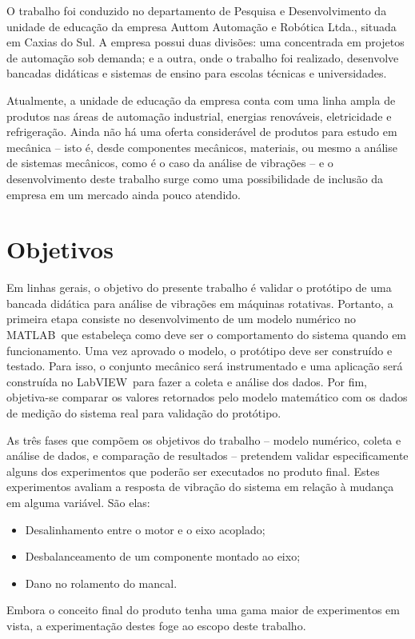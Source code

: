 \documentclass[12pt,openright,twoside,a4paper,
	chapter=TITLE,section=TITLE,
	english,brazil]{abntex2}
\begin{document}
	O trabalho foi conduzido no departamento de Pesquisa e Desenvolvimento da unidade de educação da empresa Auttom Automação e Robótica Ltda., situada em Caxias do Sul. A empresa possui duas divisões: uma concentrada em projetos de automação sob demanda; e a outra, onde o trabalho foi realizado, desenvolve bancadas didáticas e sistemas de ensino para escolas técnicas e universidades.
	
	Atualmente, a unidade de educação da empresa conta com uma linha ampla de produtos nas áreas de automação industrial, energias renováveis, eletricidade e refrigeração. Ainda não há uma oferta considerável de produtos para estudo em mecânica -- isto é, desde componentes mecânicos, materiais, ou mesmo a análise de sistemas mecânicos, como é o caso da análise de vibrações -- e o desenvolvimento deste trabalho surge como uma possibilidade de inclusão da empresa em um mercado ainda pouco atendido.
	
	\section{Objetivos}
	
	Em linhas gerais, o objetivo do presente trabalho é validar o protótipo de uma bancada didática para análise de vibrações em máquinas rotativas. Portanto, a primeira etapa consiste no desenvolvimento de um modelo numérico no MATLAB\textsuperscript\textregistered\ que estabeleça como deve ser o comportamento do sistema quando em funcionamento. Uma vez aprovado o modelo, o protótipo deve ser construído e testado. Para isso, o conjunto mecânico será instrumentado e uma aplicação será construída no LabVIEW\textsuperscript\textregistered\ para fazer a coleta e análise dos dados. Por fim, objetiva-se comparar os valores retornados pelo modelo matemático com os dados de medição do sistema real para validação do protótipo.
	
	As três fases que compõem os objetivos do trabalho -- modelo numérico, coleta e análise de dados, e comparação de resultados -- pretendem validar especificamente alguns dos experimentos que poderão ser executados no produto final. Estes experimentos avaliam a resposta de vibração do sistema em relação à mudança em alguma variável. São elas:
	\begin{itemize}
		\setlength{\itemsep}{2pt plus 2pt minus 1pt}
		\item Desalinhamento entre o motor e o eixo acoplado;
		\item Desbalanceamento de um componente montado ao eixo;
		\item Dano no rolamento do mancal.
	\end{itemize}

	Embora o conceito final do produto tenha uma gama maior de experimentos em vista, a experimentação destes foge ao escopo deste trabalho.
	
	\postextual
	
	
		
\end{document}
